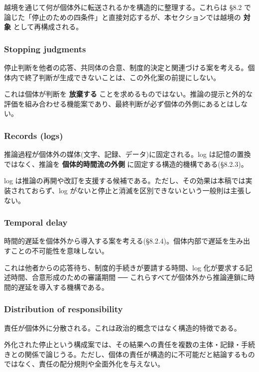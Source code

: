 越境を通じて何が個体外に転送されるかを構造的に整理する。これらは \S{}8.2 で論じた「停止のための四条件」と直接対応するが、本セクションでは越境の \textbf{対象} として再構成される。

\subsubsection{Stopping judgments}


停止判断を他者の応答、共同体の合意、制度的決定と関連づける案を考える。個体内で終了判断が生成できないことは、この外化案の前提にしない。

これは個体が判断を \textbf{放棄する} ことを求めるものではない。推論の提示と外的な評価を組み合わせる機能案であり、最終判断が必ず個体の外側にあるとはしない。

\subsubsection{Records (logs)}


推論過程が個体外の媒体(文字、記録、データ)に固定される。log は記憶の置換ではなく、推論を \textbf{個体的時間流の外側} に固定する構造的機構である(\S{}8.2.3)。

log は推論の再開や改訂を支援する候補である。ただし、その効果は本稿では実装されておらず、log がないと停止と消滅を区別できないという一般則は主張しない。

\subsubsection{Temporal delay}


時間的遅延を個体外から導入する案を考える(\S{}8.2.4)。個体内部で遅延を生み出すことの不可能性を意味しない。

これは他者からの応答待ち、制度的手続きが要請する時間、log 化が要求する記述時間、合意形成のための審議期間 ── これらすべてが個体外から推論連鎖に時間的遅延を導入する機構である。

\subsubsection{Distribution of responsibility}


責任が個体外に分散される。これは政治的概念ではなく構造的特徴である。

外化された停止という構成案では、その結果への責任を複数の主体・記録・手続きとの関係で論じうる。ただし、個体の責任が構造的に不可能だと結論するものではなく、責任の配分規則や全面外化を与えない。

